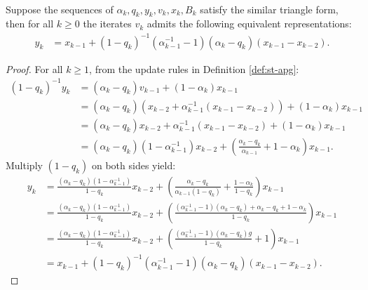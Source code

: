 \documentclass[12pt]{article}
\begin{document}
    \begin{lemma}\;\label{lemma:st-iterates-alt-form-part2}\\
        Suppose the sequences of $\alpha_k, q_k, y_k, v_k, x_k, B_k$ satisfy the similar triangle form, then for all $k \ge 0$ the iterates $v_k$ admits the following equivalent representations: 
        \begin{align*}
            y_k &= 
            x_{k -1} + (1 - q_k)^{-1}(\alpha_{k - 1}^{-1} - 1)(\alpha_k - q_k)(x_{k - 1} - x_{k - 2}). 
        \end{align*}
    \end{lemma}
    \begin{proof}
        For all $k\ge 1$, from the update rules in Definition \ref{def:st-apg}: 
        \begin{align*}
            (1 - q_k)^{-1}y_k &= 
            (\alpha_k - q_k) v_{k - 1} 
            + (1 - \alpha_k)x_{k - 1}
            \\
            &= 
            (\alpha_k - q_k)\left(
                x_{k - 2} + \alpha_{k - 1}^{-1}(x_{k - 1} - x_{k - 2})
            \right) 
            + (1 - \alpha_k)x_{k - 1}
            \\
            &= 
            (\alpha_k - q_k)x_{k - 2} 
            + \alpha_{k - 1}^{-1}(x_{k - 1} - x_{k - 2}) + (1 - \alpha_k)x_{k - 1}
            \\
            &= (\alpha_k - q_k)(1 - \alpha_{k - 1}^{-1})x_{k - 2}
            + \left(
                \frac{\alpha_k - q_k}{\alpha_{k - 1}} + 1 - \alpha_k
            \right)x_{k - 1}. 
        \end{align*}
        Multiply $(1 - q_k)$ on both sides yield: 
        \begin{align*}
            y_k &= 
            \frac{(\alpha_k - q_k)(1 - \alpha_{k - 1}^{-1})}{1 - q_k}x_{k - 2} 
            + \left(
                \frac{\alpha_k - q_k}{\alpha_{k - 1}(1 - q_k)} + \frac{1 - \alpha_k}{1 - q_k}
            \right)x_{k - 1}
            \\
            &= 
            \frac{(\alpha_k - q_k)(1 - \alpha_{k - 1}^{-1})}{1 - q_k}x_{k - 2} 
            + \left(
                \frac{
                    (\alpha_{k - 1}^{-1} -1)(\alpha_k - q_k)
                    + \alpha_k - q_k + 1 - \alpha_k
                }{1 - q_k}
            \right)x_{k - 1}
            \\
            &= \frac{(\alpha_k - q_k)(1 - \alpha_{k - 1}^{-1})}{1 - q_k}x_{k - 2} 
            + \left(
                \frac{
                    (\alpha_{k - 1}^{-1} -1)(\alpha_k - q_k)g 
                }{1 - q_k} + 1
            \right)x_{k - 1}
            \\
            &= x_{k -1} + (1 - q_k)^{-1}\left(\alpha_{k - 1}^{-1} - 1\right)(\alpha_k - q_k)(x_{k - 1} - x_{k - 2}). 
        \end{align*}
    \end{proof}
    
\end{document}

